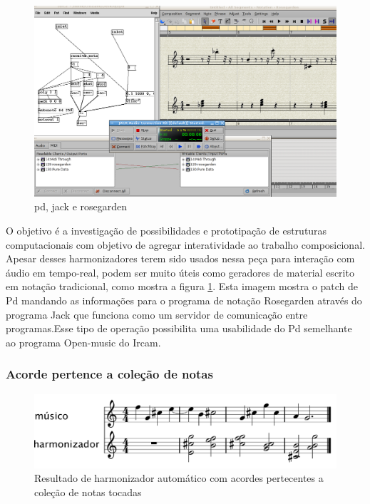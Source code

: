 \documentclass{ppgmus}
\begin{document}
\begin{figure}
\includegraphics[scale=.4]{harm5}
\caption{pd, jack e rosegarden}
\label{harm5}
\end{figure}

O objetivo é a investigação de possibilidades e prototipação de estruturas computacionais com 
objetivo de agregar interatividade ao trabalho composicional.  
	Apesar desses harmonizadores terem sido usados nessa peça para interação com áudio em 
tempo-real, podem ser muito úteis como geradores de material escrito em notação tradicional, 
como mostra a figura \ref{harm5}. Esta imagem mostra o patch de Pd mandando as informações para o programa 
de notação Rosegarden através do programa Jack que funciona como um servidor de comunicação entre 
programas.Esse tipo de operação possibilita uma usabilidade do Pd semelhante ao programa Open-music 
do Ircam.


\subsubsection{Acorde pertence a coleção de notas}

\begin{figure}
\includegraphics[scale=.5]{harm-colecao}
\caption{Resultado de harmonizador automático com acordes pertecentes a coleção de notas tocadas}
\label{harm-colecao}
\end{figure}
\end{document}

